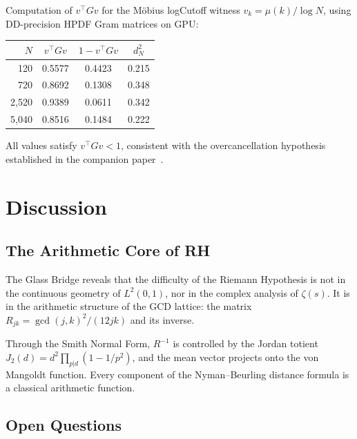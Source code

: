 \documentclass[11pt,a4paper]{article}
\begin{document}
Computation of $v^\top G v$ for the M\"obius logCutoff witness
$v_k = \mu(k)/\log N$, using DD-precision HPDF Gram matrices
on GPU:

\begin{center}
\begin{tabular}{@{}rccc@{}}
\toprule
$N$ & $v^\top G v$ & $1 - v^\top G v$ & $d_N^2$ \\
\midrule
120 & 0.5577 & 0.4423 & 0.215 \\
720 & 0.8692 & 0.1308 & 0.348 \\
2{,}520 & 0.9389 & 0.0611 & 0.342 \\
5{,}040 & 0.8516 & 0.1484 & 0.222 \\
\bottomrule
\end{tabular}
\end{center}

\noindent
All values satisfy $v^\top G v < 1$, consistent with the
overcancellation hypothesis established in the companion
paper~\cite{overcancellation}.

\section{Discussion}
\label{sec:discussion}

\subsection{The Arithmetic Core of RH}

The Glass Bridge reveals that the difficulty of the Riemann
Hypothesis is not in the continuous geometry of $L^2(0,1)$,
nor in the complex analysis of $\zeta(s)$. It is in the
arithmetic structure of the GCD lattice: the matrix
$R_{jk} = \gcd(j,k)^2/(12jk)$ and its inverse.

Through the Smith Normal Form, $R^{-1}$ is controlled by
the Jordan totient $J_2(d) = d^2 \prod_{p|d}(1-1/p^2)$,
and the mean vector projects onto the von Mangoldt function.
Every component of the Nyman--Beurling distance formula is
a classical arithmetic function.

\subsection{Open Questions}
\end{document}
